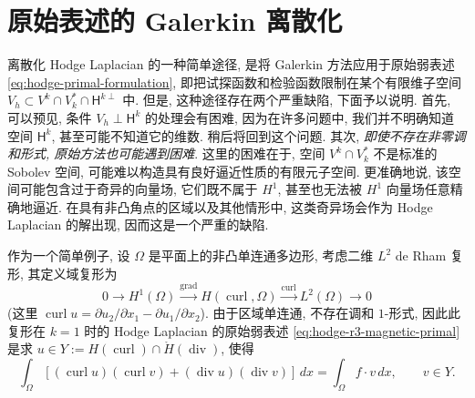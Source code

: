 \section{{原始表述的 Galerkin 离散化}}\label{sec:primal-galerkin}

{离散化 Hodge Laplacian 的一种简单途径, 是将 Galerkin 方法应用于原始弱表述 \eqref{eq:hodge-primal-formulation}, 即把试探函数和检验函数限制在某个有限维子空间 $V_h\subset V^k\cap V_k^*\cap\mathsf H^{k\perp}$ 中. 但是, 这种途径存在两个严重缺陷, 下面予以说明. 首先, 可以预见, 条件 $V_h\perp\mathsf H^k$ 的处理会有困难, 因为在许多问题中, 我们并不明确知道空间 $\mathsf H^k$, 甚至可能不知道它的维数. 稍后将回到这个问题. 其次, \emph{即使不存在非零调和形式, 原始方法也可能遇到困难}. 这里的困难在于, 空间 $V^k\cap V_k^*$ 不是标准的 Sobolev 空间, 可能难以构造具有良好逼近性质的有限元子空间. 更准确地说, 该空间可能包含过于奇异的向量场, 它们既不属于 $H^1$, 甚至也无法被 $H^1$ 向量场任意精确地逼近. 在具有非凸角点的区域以及其他情形中, 这类奇异场会作为 Hodge Laplacian 的解出现, 因而这是一个严重的缺陷.}

{作为一个简单例子, 设 $\Omega$ 是平面上的非凸单连通多边形, 考虑二维 $L^2$ de Rham 复形, 其定义域复形为}
\[
0\to H^1(\Omega)\xrightarrow{\operatorname{grad}}H(\operatorname{curl},\Omega)\xrightarrow{\operatorname{curl}}L^2(\Omega)\to0
\]
{(这里 $\operatorname{curl}u=\partial u_2/\partial x_1-\partial u_1/\partial x_2$). 由于区域单连通, 不存在调和 $1$-形式, 因此此复形在 $k=1$ 时的 Hodge Laplacian 的原始弱表述 \eqref{eq:hodge-r3-magnetic-primal} 是求 $u\in Y:=H(\operatorname{curl})\cap\mathring H(\operatorname{div})$, 使得}
\begin{equation}\label{eq:primal-galerkin-polygon}
\int_\Omega[(\operatorname{curl}u)(\operatorname{curl}v)+(\operatorname{div}u)(\operatorname{div}v)]\,dx=\int_\Omega f\cdot v\,dx,\qquad v\in Y.
\end{equation}

